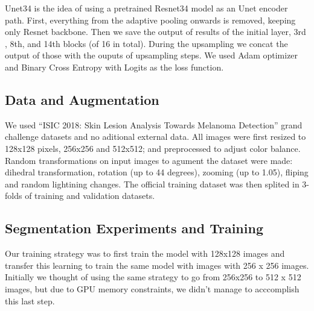 \documentclass[conference]{IEEEtran}
\begin{document}
Unet34 is the idea of using a pretrained Resnet34 model as an Unet encoder path\cite{fastai}. First, everything from the adaptive pooling onwards is removed, keeping only Resnet backbone. Then we save the output of results of the initial layer, 3rd , 8th, and 14th blocks (of 16 in total). During the upsampling we concat the output of those with the ouputs of upsampling steps. We used Adam optimizer and Binary Cross Entropy with Logits as the loss function.

\subsection{Data and Augmentation}
We used “ISIC 2018: Skin Lesion Analysis Towards Melanoma Detection” grand challenge datasets \cite{codella, ham} and no aditional external data. All images were first resized to 128x128 pixels, 256x256 and 512x512; and preprocessed to adjust color balance. Random transformations on input images to agument the dataset were made: dihedral transformation, rotation (up to 44 degrees), zooming (up to 1.05), fliping and random lightining changes. The official training dataset was then splited in 3-folds of training and validation datasets.  


\subsection{Segmentation Experiments and Training}
\label{sec:seg_training}
Our training strategy was to first train the model with 128x128 images and transfer this learning to train the same model with images with 256 x 256 images. Initially we thought of using the same strategy to go from 256x256 to 512 x 512 images, but due to GPU memory constraints, we didn't manage to acccomplish this last step.
\end{document}
